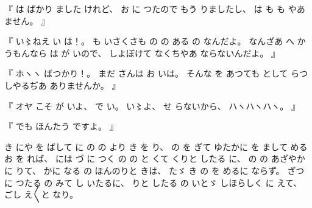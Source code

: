 %
『
は
ばかり
ました
けれど、
%
お
に
つたので
もう
りましたし、
%
は
も
も
やあ
ません。
』

%
『
い〻ねえ%
い
は！。
%
も
いさくさも
の
の
ある
の
なんだよ。
%
なんざあ
へ
かうもんなら
は
が
いので、
%
しよぼけて
なくちやあ
ならないんだよ。
』

%
『
ホヽヽ
ばつかり！。
%
まだ
さんは
お
いは。
%
そんな
を
あつても
として
らつしやるぢあ
ありませんか。
』

%
『
オヤ
こそ
が
いよ、
%
で
い。
%
い〻よ、%
%
せ
らないから、
%
ハヽハヽハヽ。
』

%
『
でも
ほんたう
ですよ。
』

%
き%
にや
を
ばして
に
の
の
より
き
を
り、
%
の
を
ぎて
ゆたかに
を
まして
める
お
を
れば、
%
には
づ
に
つく
の
の
と
くて
くりと
したる
に、
%
の
の
あざやかに
りて、
%
かに
なる
の
ほんのりと
きは、
%
たゞ%
き
の
を
めるに%
ならず。
%
ざつに
つたる
の
みて
し
いたるに、
%
りと
したる
の
いとゞ%
しほらしく
に
えて、
%
ごし
え〳〵と
なり。%

